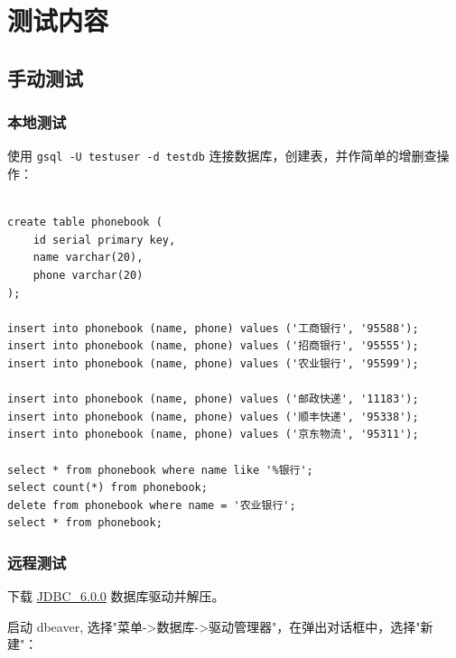 \documentclass{article}
\begin{document}
\section{测试内容}

\subsection{手动测试}

\subsubsection{本地测试}

使用 \verb|gsql -U testuser -d testdb| 连接数据库，创建表，并作简单的增删查操作：

\begin{verbatim}
  
create table phonebook (
    id serial primary key,
    name varchar(20),
    phone varchar(20)
);

insert into phonebook (name, phone) values ('工商银行', '95588');
insert into phonebook (name, phone) values ('招商银行', '95555');
insert into phonebook (name, phone) values ('农业银行', '95599');

insert into phonebook (name, phone) values ('邮政快递', '11183');
insert into phonebook (name, phone) values ('顺丰快递', '95338');
insert into phonebook (name, phone) values ('京东物流', '95311');

select * from phonebook where name like '%银行';
select count(*) from phonebook;
delete from phonebook where name = '农业银行';
select * from phonebook;

\end{verbatim}

\subsubsection{远程测试}

下载 \href{https://opengauss.org/zh/download/}{JDBC\_6.0.0} 数据库驱动并解压。

启动 dbeaver, 选择"菜单->数据库->驱动管理器"，在弹出对话框中，选择"新建"：
\end{document}
